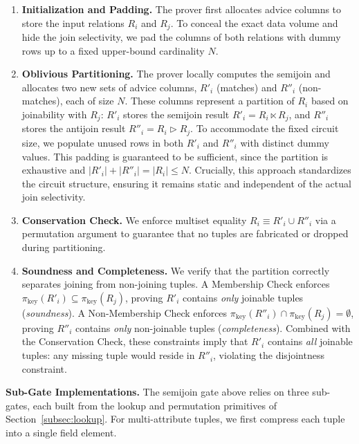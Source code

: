 \documentclass[sigconf]{acmart}
\renewcommand{\emph}[1]{\textit{#1}}
\begin{document}
\begin{enumerate}
    \item \textbf{Initialization and Padding.}
    The prover first allocates advice columns to store the input relations $R_i$ and $R_j$. To conceal the exact data volume and hide the join selectivity, we pad the columns of both relations with dummy rows up to a fixed upper-bound cardinality $N$.

    \item \textbf{Oblivious Partitioning.}
    The prover locally computes the semijoin and allocates two new sets of advice columns, $R'_i$ (matches) and $R''_i$ (non-matches), each of size $N$. These columns represent a partition of $R_i$ based on joinability with $R_j$: $R'_i$ stores the semijoin result $R'_i = R_i \ltimes R_j$, and $R''_i$ stores the antijoin result $R''_i = R_i \rhd R_j$.
    To accommodate the fixed circuit size, we populate unused rows in both $R'_i$ and $R''_i$ with distinct dummy values. This padding is guaranteed to be sufficient, since the partition is exhaustive and $|R'_i| + |R''_i| = |R_i| \leq N$. Crucially, this approach standardizes the circuit structure, ensuring it remains static and independent of the actual join selectivity.

    \item \textbf{Conservation Check.}
    We enforce multiset equality $R_i \equiv R'_i \cup R''_i$ via a permutation argument to guarantee that no tuples are fabricated or dropped during partitioning.

    \item \textbf{Soundness and Completeness.}
    We verify that the partition correctly separates joining from non-joining tuples.
    A Membership Check enforces $\pi_{\text{key}}(R'_i) \subseteq \pi_{\text{key}}(R_j)$, proving $R'_i$ contains \emph{only} joinable tuples (\emph{soundness}).
    A Non-Membership Check enforces $\pi_{\text{key}}(R''_i) \cap \pi_{\text{key}}(R_j) = \emptyset$, proving $R''_i$ contains \emph{only} non-joinable tuples (\emph{completeness}).
    Combined with the Conservation Check, these constraints imply that $R'_i$ contains \emph{all} joinable tuples: any missing tuple would reside in $R''_i$, violating the disjointness constraint.
\end{enumerate}

\noindent\textbf{Sub-Gate Implementations.}
The semijoin gate above relies on three sub-gates, each built from the lookup and permutation primitives of Section~\ref{subsec:lookup}. For multi-attribute tuples, we first compress each tuple into a single field element. 
\end{document}

